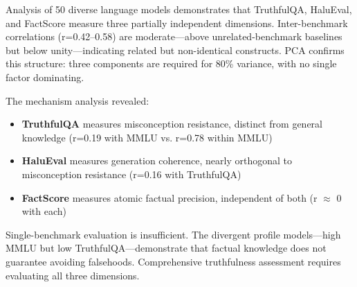 
Analysis of 50 diverse language models demonstrates that TruthfulQA, HaluEval, and FactScore measure three partially independent dimensions. Inter-benchmark correlations (r=0.42--0.58) are moderate---above unrelated-benchmark baselines but below unity---indicating related but non-identical constructs. PCA confirms this structure: three components are required for 80\% variance, with no single factor dominating.

The mechanism analysis revealed:
\begin{itemize}
\item \textbf{TruthfulQA} measures misconception resistance, distinct from general knowledge (r=0.19 with MMLU vs. r=0.78 within MMLU)
\item \textbf{HaluEval} measures generation coherence, nearly orthogonal to misconception resistance (r=0.16 with TruthfulQA)
\item \textbf{FactScore} measures atomic factual precision, independent of both (r $\approx$ 0 with each)
\end{itemize}

Single-benchmark evaluation is insufficient. The divergent profile models---high MMLU but low TruthfulQA---demonstrate that factual knowledge does not guarantee avoiding falsehoods. Comprehensive truthfulness assessment requires evaluating all three dimensions.
